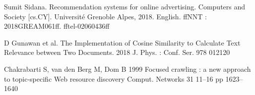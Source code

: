 \begin{thebibliography}{9}
Sumit Sidana. Recommendation systems for online advertising. Computers and Society [cs.CY].
Université Grenoble Alpes, 2018. English. ffNNT : 2018GREAM061ff. fftel-02060436ff

D Gunawan et al. The Implementation of Cosine Similarity to Calculate Text Relevance between Two Documents. 2018 J. Phys. : Conf. Ser. 978 012120


Chakrabarti S, van den Berg M, Dom B 1999 Focused crawling : a new approach to topic-specific Web resource discovery Comput. Networks 31 11–16 pp 1623–1640


\end{thebibliography}
